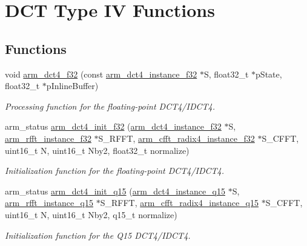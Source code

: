 \hypertarget{group___d_c_t4___i_d_c_t4}{\section{D\-C\-T Type I\-V Functions}
\label{group___d_c_t4___i_d_c_t4}
}
\subsection*{Functions}
\begin{DoxyCompactItemize}
\item 
void \hyperlink{group___d_c_t4___i_d_c_t4_gafd538d68886848bc090ec2b0d364cc81}{arm\-\_\-dct4\-\_\-f32} (const \hyperlink{structarm__dct4__instance__f32}{arm\-\_\-dct4\-\_\-instance\-\_\-f32} $\ast$S, float32\-\_\-t $\ast$p\-State, float32\-\_\-t $\ast$p\-Inline\-Buffer)
\begin{DoxyCompactList}\small\item\em Processing function for the floating-\/point D\-C\-T4/\-I\-D\-C\-T4. \end{DoxyCompactList}\item 
arm\-\_\-status \hyperlink{group___d_c_t4___i_d_c_t4_gab094ad3bc6fa1b84e8b12a24e1850a06}{arm\-\_\-dct4\-\_\-init\-\_\-f32} (\hyperlink{structarm__dct4__instance__f32}{arm\-\_\-dct4\-\_\-instance\-\_\-f32} $\ast$S, \hyperlink{structarm__rfft__instance__f32}{arm\-\_\-rfft\-\_\-instance\-\_\-f32} $\ast$S\-\_\-\-R\-F\-F\-T, \hyperlink{structarm__cfft__radix4__instance__f32}{arm\-\_\-cfft\-\_\-radix4\-\_\-instance\-\_\-f32} $\ast$S\-\_\-\-C\-F\-F\-T, uint16\-\_\-t N, uint16\-\_\-t Nby2, float32\-\_\-t normalize)
\begin{DoxyCompactList}\small\item\em Initialization function for the floating-\/point D\-C\-T4/\-I\-D\-C\-T4. \end{DoxyCompactList}\item 
arm\-\_\-status \hyperlink{group___d_c_t4___i_d_c_t4_ga966fd1b66a80873964533703ab5dc054}{arm\-\_\-dct4\-\_\-init\-\_\-q15} (\hyperlink{structarm__dct4__instance__q15}{arm\-\_\-dct4\-\_\-instance\-\_\-q15} $\ast$S, \hyperlink{structarm__rfft__instance__q15}{arm\-\_\-rfft\-\_\-instance\-\_\-q15} $\ast$S\-\_\-\-R\-F\-F\-T, \hyperlink{structarm__cfft__radix4__instance__q15}{arm\-\_\-cfft\-\_\-radix4\-\_\-instance\-\_\-q15} $\ast$S\-\_\-\-C\-F\-F\-T, uint16\-\_\-t N, uint16\-\_\-t Nby2, q15\-\_\-t normalize)
\begin{DoxyCompactList}\small\item\em Initialization function for the Q15 D\-C\-T4/\-I\-D\-C\-T4. \end{DoxyCompactList}\item 

\end{DoxyCompactItemize}
